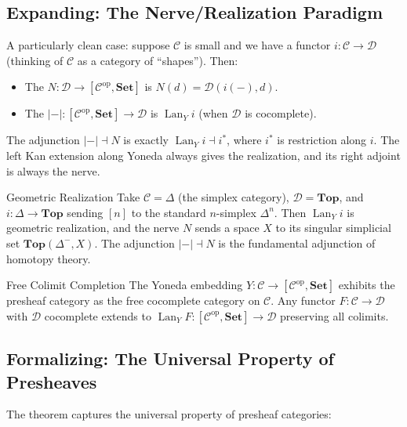 \subsection{Expanding: The Nerve/Realization Paradigm}

A particularly clean case: suppose $\mathcal{C}$ is small and we have a functor
$i : \mathcal{C} \to \mathcal{D}$ (thinking of $\mathcal{C}$ as a category of
``shapes''). Then:
\begin{itemize}
  \item The  $N : \mathcal{D} \to [\mathcal{C}^{\mathrm{op}},
        \mathbf{Set}]$ is $N(d) = \mathcal{D}(i(-), d)$.
  \item The  $|{-}| : [\mathcal{C}^{\mathrm{op}},
        \mathbf{Set}] \to \mathcal{D}$ is $\operatorname{Lan}_Y i$ (when
        $\mathcal{D}$ is cocomplete).
\end{itemize}
The adjunction $|{-}| \dashv N$ is exactly $\operatorname{Lan}_Y i \dashv i^*$,
where $i^*$ is restriction along $i$. The left Kan extension along Yoneda always
gives the realization, and its right adjoint is always the nerve.

\begin{example}{Geometric Realization}
Take $\mathcal{C} = \Delta$ (the simplex category), $\mathcal{D} = \mathbf{Top}$,
and $i : \Delta \to \mathbf{Top}$ sending $[n]$ to the standard $n$-simplex
$\Delta^n$. Then $\operatorname{Lan}_Y i$ is geometric realization, and the nerve
$N$ sends a space $X$ to its singular simplicial set $\mathbf{Top}(\Delta^-, X)$.
The adjunction $|{-}| \dashv N$ is the fundamental adjunction of homotopy theory.
\end{example}

\begin{example}{Free Colimit Completion}
The Yoneda embedding $Y : \mathcal{C} \to [\mathcal{C}^{\mathrm{op}}, \mathbf{Set}]$
exhibits the presheaf category as the free cocomplete category on $\mathcal{C}$.
Any functor $F : \mathcal{C} \to \mathcal{D}$ with $\mathcal{D}$ cocomplete
extends to $\operatorname{Lan}_Y F : [\mathcal{C}^{\mathrm{op}}, \mathbf{Set}]
\to \mathcal{D}$ preserving all colimits.
\end{example}

\subsection{Formalizing: The Universal Property of Presheaves}

The theorem captures the universal property of presheaf categories:

